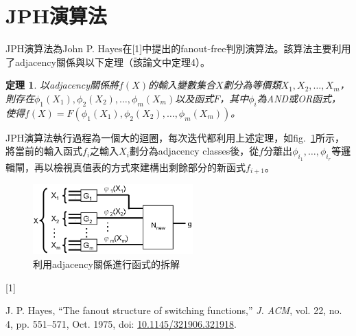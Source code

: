 \documentclass[
  12pt,
  paper=a4,
  ,captions=tableheading
]{scrartcl}
\newtheorem*{thm}{定理}
\newlength{\cslhangindent}
\newlength{\csllabelwidth}
\newenvironment{CSLReferences}[2] %
 {%
  \setlength{\parindent}{0pt}
  \ifodd #1 \everypar{\setlength{\hangindent}{\cslhangindent}}\ignorespaces\fi
  \ifnum #2 > 0
  \setlength{\parskip}{#2\baselineskip}
  \fi
 }%
 {}
\newcommand{\CSLLeftMargin}[1]{\parbox[t]{\csllabelwidth}{#1}}
\newcommand{\CSLRightInline}[1]{\parbox[t]{\linewidth - \csllabelwidth}{#1}\break}
\begin{document}
\hypertarget{jphux6f14ux7b97ux6cd5}{%
\section{JPH演算法}\label{jphux6f14ux7b97ux6cd5}}

JPH演算法為John P.
Hayes在{[}1{]}中提出的fanout-free判別演算法。該算法主要利用了adjacency關係與以下定理（該論文中定理4）。

\begin{thm}

以adjacency關係將$f(X)$的輸入變數集合$X$劃分為等價類$X_1, X_2, \dots, X_m$，
則存在$\phi_1(X_1), \phi_2(X_2), \dots, \phi_m(X_m)$以及函式$F$，其中$\phi_i$為AND或OR函式，
使得$f(X) = F(\phi_1(X_1), \phi_2(X_2), \dots, \phi_m(X_m))$。

\end{thm}

JPH演算法執行過程為一個大的迴圈，每次迭代都利用上述定理，如fig.~\ref{fig:decomp}所示，將當前的輸入函式\(f_i\)之輸入\(X_i\)劃分為adjacency
classes後，從\(f\)分離出\(\phi_{i_1}, \dots, \phi_{i_r}\)等邏輯閘，再以檢視真值表的方式來建構出剩餘部分的新函式\(f_{i+1}\)。

\begin{figure}
\hypertarget{fig:decomp}{%
\centering
\includegraphics[width=0.55\textwidth,height=\textheight]{./resources/adj-decomp.png}
\caption{利用adjacency關係進行函式的拆解}\label{fig:decomp}
}
\end{figure}

\hypertarget{refs}{}
\begin{CSLReferences}{0}{0}
\leavevmode{}%
\CSLLeftMargin{{[}1{]} }
\CSLRightInline{J. P. Hayes, {``The fanout structure of switching
functions,''} \emph{J. ACM}, vol. 22, no. 4, pp. 551--571, Oct. 1975,
doi:
\href{https://doi.org/10.1145/321906.321918}{10.1145/321906.321918}.}

\end{CSLReferences}
\end{document}
